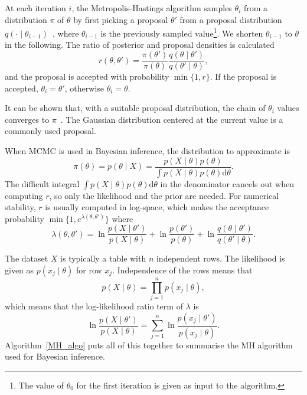 \documentclass[english,twoside,openright]{HYgraduMLDS}
\newcommand{\dx}{\mathrm{d}}
\begin{document}
At each iteration \(i\), the Metropolis-Hastings algorithm samples \(\theta_i\) 
from a distribution \(\pi\) of \(\theta\)
by first picking a proposal \(\theta'\) from a proposal 
distribution \(q(\cdot \mid \theta_{i-1})\)~\cite{MRR53}, where \(\theta_{i-1}\) is the
previously sampled value\footnote{
    The value of \(\theta_0\) for the first iteration is given as input to the 
    algorithm.
}. We shorten \(\theta_{i-1}\) to \(\theta\) in the following. 
The ratio of posterior and proposal densities is calculated
\[
    r(\theta, \theta') = \frac{\pi(\theta')}{\pi(\theta)}
    \frac{q(\theta\mid \theta')}{q(\theta'\mid \theta)},
\]
and the proposal is accepted with probability \(\min\{1, r\}\). 
If the proposal is accepted, 
\(\theta_i = \theta'\), otherwise \(\theta_i = \theta\).

It can be shown that, with a suitable proposal distribution, the chain of 
\(\theta_i\) values converges to \(\pi\)~\cite{Has70}. The Gaussian distribution centered
at the current value is a commonly used proposal.

When MCMC is used in Bayesian inference, the distribution to approximate is 
\[
    \pi(\theta) = p(\theta \mid X) = \frac{p(X \mid \theta)p(\theta)}
    {\int p(X\mid \theta)p(\theta)\dx\theta}.
\]
The difficult integral \(\int p(X\mid \theta)p(\theta)\dx\theta\) in the denominator
cancels out when computing \(r\), so only the likelihood and the prior are needed. 
For numerical stability, \(r\) is usually computed in 
log-space, which makes the acceptance probability
\(\min\{1, e^{\lambda(\theta, \theta')}\}\) where 
\begin{equation}\label{lambda_equation}
    \lambda(\theta, \theta') = \ln \frac{p(X\mid \theta')}{p(X\mid \theta)}
    + \ln \frac{p(\theta')}{p(\theta)}
    + \ln \frac{q(\theta\mid \theta')}{q(\theta'\mid \theta)}.
\end{equation}

The dataset \(X\) is typically a table with \(n\) independent rows.
The likelihood is given as \(p(x_j\mid \theta)\)
for row \(x_j\). Independence of the rows means that 
\[
    p(X\mid \theta) = \prod_{j=1}^n p(x_j\mid \theta),
\]
which means that the log-likelihood ratio term of \(\lambda\) is
\[
    \ln \frac{p(X\mid \theta')}{p(X\mid \theta)}
    = \sum_{j=1}^n \ln\frac{p(x_j\mid \theta')}{p(x_j\mid \theta)}.
\]
Algorithm~\ref{MH_algo} puts all of this together to summarise the MH 
algorithm used for Bayesian inference.
\end{document}
